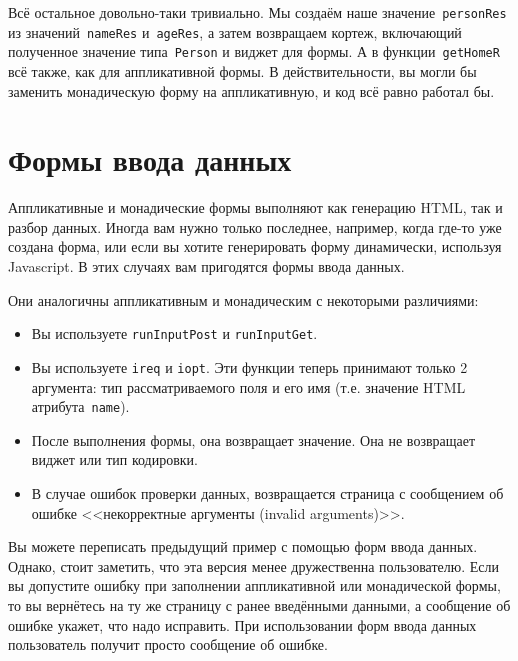 Всё остальное довольно-таки тривиально. Мы создаём наше
значение~\lstinline'personRes' из значений~\lstinline'nameRes'
и~\lstinline'ageRes', а затем возвращаем кортеж, включающий полученное значение
типа~\lstinline'Person' и виджет для формы. А в функции~\lstinline'getHomeR'
всё также, как для аппликативной формы. В действительности, вы могли бы
заменить монадическую форму на аппликативную, и код всё равно работал бы.

\section{Формы ввода данных}
Аппликативные и монадические формы выполняют как генерацию HTML, так и разбор
данных.  Иногда вам нужно только последнее, например, когда где-то уже создана
форма, или если вы хотите генерировать форму динамически, используя
Javascript. В этих случаях вам пригодятся формы ввода данных.

Они аналогичны аппликативным и монадическим с некоторыми различиями:
\begin{itemize}
    \item Вы используете \lstinline'runInputPost' и \lstinline'runInputGet'.

    \item Вы используете \lstinline'ireq' и \lstinline'iopt'. Эти функции
        теперь принимают только 2 аргумента: тип рассматриваемого поля и его
        имя (т.е. значение HTML атрибута~\texttt{name}).

    \item После выполнения формы, она возвращает значение. Она не возвращает
        виджет или тип кодировки.

    \item В случае ошибок проверки данных, возвращается страница с сообщением
        об ошибке <<некорректные аргументы (invalid arguments)>>.
\end{itemize}

Вы можете переписать предыдущий пример с помощью форм ввода данных. Однако,
стоит заметить, что эта версия менее дружественна пользователю. Если вы
допустите ошибку при заполнении аппликативной или монадической формы, то вы
вернётесь на ту же страницу с ранее введёнными данными, а сообщение об ошибке
укажет, что надо исправить. При использовании форм ввода данных пользователь
получит просто сообщение об ошибке.



